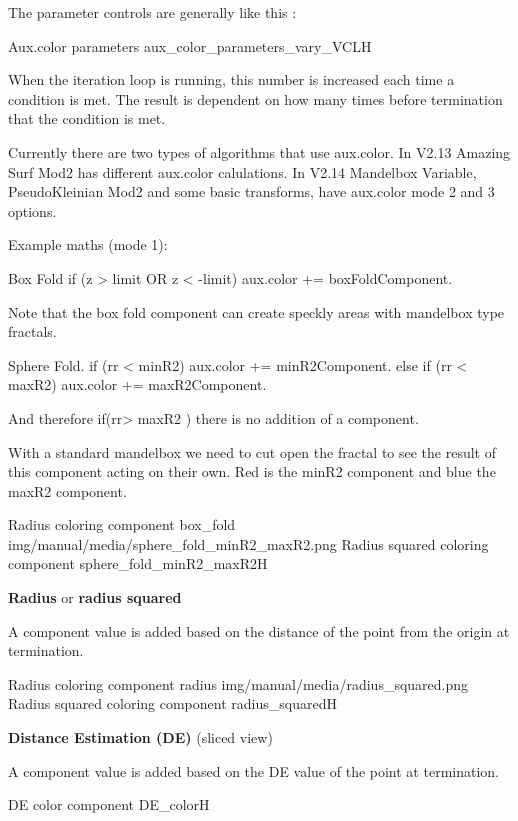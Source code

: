 The parameter controls are generally like this :

{Aux.color parameters}
{aux_color_parameters_vary_VCL}{H}

When the iteration loop is running, this number is increased each time a condition is met.  The result is dependent on how many times before termination  that the condition is met.

Currently there are two types of algorithms that use aux.color. In V2.13 Amazing Surf Mod2 has different aux.color calulations. In V2.14 Mandelbox Variable, PseudoKleinian Mod2 and some basic transforms, have aux.color mode 2 and 3 options.

Example  maths (mode 1):

Box Fold
if  (z  >  limit  OR  z  <   -limit)   aux.color +=  boxFoldComponent.

Note that the box fold component can create  speckly areas with mandelbox type fractals.

Sphere Fold. 
if (rr < minR2)    aux.color +=  minR2Component.
else if (rr < maxR2)    aux.color +=  maxR2Component.

And therefore  if(rr> maxR2 ) there is no addition of a component.

With a standard mandelbox we need to cut open the fractal to see the result of this component acting on their own. Red is the minR2 component and blue the maxR2 component.

{Radius coloring component}
{box_fold}
{img/manual/media/sphere_fold_minR2_maxR2.png}
{Radius squared coloring component}
{sphere_fold_minR2_maxR2}{H}

\textbf{Radius} or \textbf{radius squared} 

A  component value is added based on the distance of the point from the origin at termination.

{Radius coloring component}
{radius}
{img/manual/media/radius_squared.png}
{Radius squared coloring component}
{radius_squared}{H}

\textbf{Distance Estimation (DE)}  (sliced view)

A  component value is added based on the DE value of the point at termination.

{DE color component}
{DE_color}{H}

